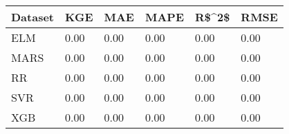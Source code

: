 \begin{tabular}{llllll}
\toprule
Dataset &  KGE &  MAE & MAPE & R\$\textasciicircum 2\$ & RMSE \\
\midrule
    ELM & 0.00 & 0.00 & 0.00 &  0.00 & 0.00 \\
   MARS & 0.00 & 0.00 & 0.00 &  0.00 & 0.00 \\
     RR & 0.00 & 0.00 & 0.00 &  0.00 & 0.00 \\
    SVR & 0.00 & 0.00 & 0.00 &  0.00 & 0.00 \\
    XGB & 0.00 & 0.00 & 0.00 &  0.00 & 0.00 \\
\bottomrule
\end{tabular}
